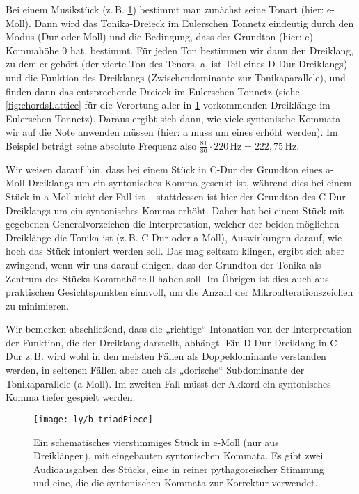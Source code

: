 Bei einem Musikstück (z.\,B. \cref{fig:triadPiece}) bestimmt man zunächst seine
Tonart (hier: e-Moll). Dann wird das Tonika-Dreieck im Eulerschen Tonnetz
eindeutig durch den Modus (Dur oder Moll) und die Bedingung, dass der Grundton
(hier: e) Kommahöhe $0$ hat, bestimmt. Für jeden Ton bestimmen wir dann den
Dreiklang, zu dem er gehört (der vierte Ton des Tenors, a, ist Teil eines
D-Dur-Dreiklangs) und die Funktion des Dreiklangs (Zwischendominante zur
Tonikaparallele), und finden dann das entsprechende Dreieck im Eulerschen
Tonnetz (siehe \cref{fig:chordsLattice} für die Verortung aller in
\cref{fig:triadPiece} vorkommenden Dreiklänge im Eulerschen Tonnetz). Daraus
ergibt sich dann, wie viele syntonische Kommata wir auf die Note anwenden müssen
(hier: a muss um eines erhöht werden). Im Beispiel beträgt seine absolute
Frequenz also
$\frac{81}{80}\cdot 220\,\text{Hz}=222{,}75\,\text{Hz}$.

Wir weisen darauf hin, dass bei einem Stück in C-Dur der Grundton eines
a-Moll-Dreiklangs um ein syntonisches Komma gesenkt ist, während dies bei einem
Stück in a-Moll nicht der Fall ist – stattdessen ist hier der Grundton des
C-Dur-Dreiklangs um ein syntonisches Komma erhöht. Daher hat bei einem Stück mit
gegebenen Generalvorzeichen die Interpretation, welcher der beiden möglichen
Dreiklänge die Tonika ist (z.\,B. C-Dur oder a-Moll), Auswirkungen darauf, wie
hoch das Stück intoniert werden soll. Das mag seltsam klingen, ergibt sich aber
zwingend, wenn wir uns darauf einigen, dass der Grundton der Tonika als Zentrum
des Stücks Kommahöhe $0$ haben soll. Im Übrigen ist dies auch aus praktischen
Gesichtspunkten sinnvoll, um die Anzahl der Mikroalterationszeichen zu
minimieren.


Wir bemerken abschließend, dass die „richtige“ Intonation von der Interpretation der
Funktion, die der Dreiklang darstellt, abhängt. Ein D-Dur-Dreiklang in C-Dur
z.\,B.  wird wohl in den meisten Fällen als Doppeldominante verstanden werden,
in seltenen Fällen aber auch als „dorische“ Subdominante der Tonikaparallele
(a-Moll). Im zweiten Fall müsst der Akkord ein syntonisches Komma tiefer
gespielt werden.

\begin{figure}
  \centering
  \texttt{[image: ly/b-triadPiece]}
  \caption{Ein schematisches vierstimmiges Stück in e-Moll (nur aus
  	Dreiklängen), mit eingebauten syntonischen Kommata. Es gibt zwei
  	Audioausgaben des Stücks, eine in reiner pythagoreischer Stimmung und eine,
  	die die syntonischen Kommata zur Korrektur
  	verwendet.}\label{fig:triadPiece}
\end{figure}

